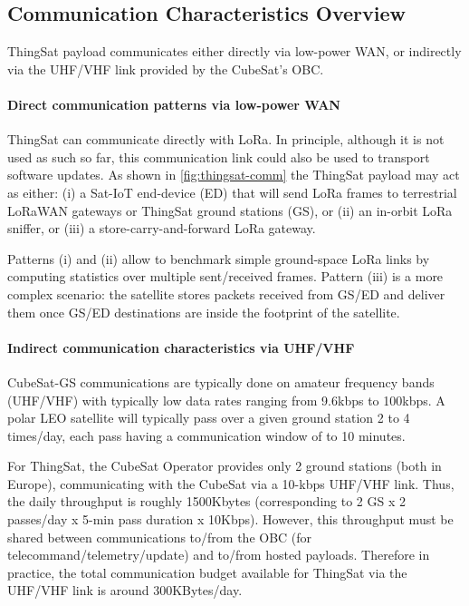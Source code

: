 \subsection{Communication Characteristics Overview}
\label{sec:thingsat-comm-characteristics}

ThingSat payload communicates either directly via low-power WAN, or indirectly
via the UHF/VHF link provided by the CubeSat's OBC.

\paragraph*{Direct communication patterns via low-power WAN}
ThingSat can communicate directly with LoRa. In principle, although it is not used as
such so far, this communication link could also be used to transport software updates.
As shown in \autoref{fig:thingsat-comm} the ThingSat payload may act as either:
(i) a Sat-IoT end-device (ED) that will send LoRa frames to terrestrial LoRaWAN gateways or ThingSat ground stations (GS), or
(ii) an in-orbit LoRa sniffer, or
(iii) a store-carry-and-forward LoRa gateway.

Patterns (i) and (ii) allow to benchmark simple ground-space LoRa links by
computing statistics over multiple sent/received frames.
Pattern (iii) is a more
complex scenario: the satellite stores packets received from GS/ED and deliver
them once GS/ED destinations are inside the footprint of the satellite.

\paragraph*{Indirect communication characteristics via UHF/VHF}
CubeSat-GS communications are typically done on amateur frequency
bands (UHF/VHF) with typically low data rates ranging from 9.6kbps to
100kbps.
A polar LEO satellite will typically pass over a given ground station 2 to 4 times/day,
each pass having a communication window of to 10 minutes.

For ThingSat, the CubeSat Operator provides only 2 ground stations (both in Europe), communicating with
the CubeSat via a 10-kbps UHF/VHF link. Thus, the daily throughput is roughly
1500Kbytes (corresponding to 2 GS x 2 passes/day x 5-min pass duration x 10Kbps).
However, this throughput must be shared between communications to/from the OBC
(for telecommand/telemetry/update) and to/from hosted payloads. Therefore in practice,
the total communication budget available for ThingSat via the UHF/VHF link is around
300KBytes/day.

